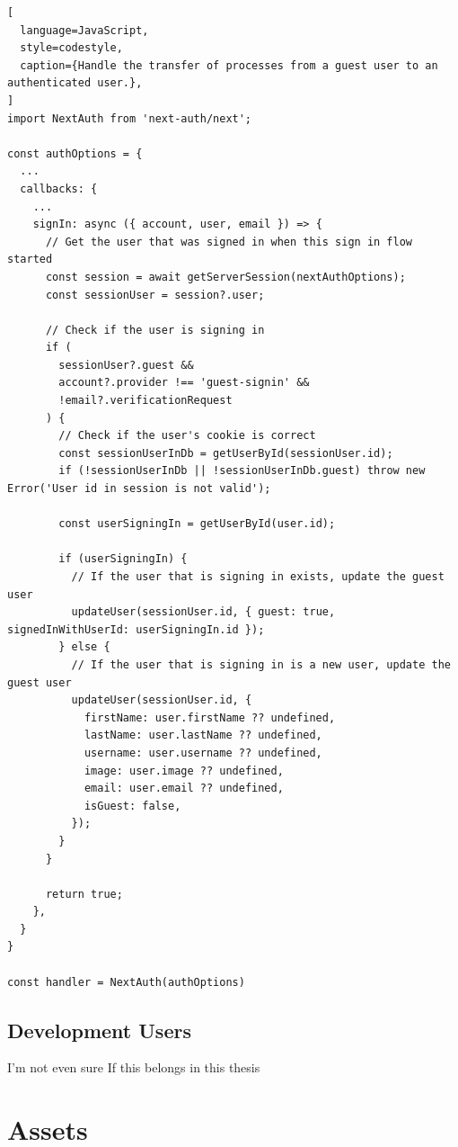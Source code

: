 \begin{lstlisting}[
  language=JavaScript,
  style=codestyle,
  caption={Handle the transfer of processes from a guest user to an authenticated user.},
]
import NextAuth from 'next-auth/next';

const authOptions = {
  ...
  callbacks: {
    ...
    signIn: async ({ account, user, email }) => {
      // Get the user that was signed in when this sign in flow started
      const session = await getServerSession(nextAuthOptions);
      const sessionUser = session?.user;

      // Check if the user is signing in
      if (
        sessionUser?.guest &&
        account?.provider !== 'guest-signin' &&
        !email?.verificationRequest
      ) {
        // Check if the user's cookie is correct
        const sessionUserInDb = getUserById(sessionUser.id);
        if (!sessionUserInDb || !sessionUserInDb.guest) throw new Error('User id in session is not valid');

        const userSigningIn = getUserById(user.id);

        if (userSigningIn) {
          // If the user that is signing in exists, update the guest user
          updateUser(sessionUser.id, { guest: true, signedInWithUserId: userSigningIn.id });
        } else {
          // If the user that is signing in is a new user, update the guest user
          updateUser(sessionUser.id, {
            firstName: user.firstName ?? undefined,
            lastName: user.lastName ?? undefined,
            username: user.username ?? undefined,
            image: user.image ?? undefined,
            email: user.email ?? undefined,
            isGuest: false,
          });
        }
      }

      return true;
    },
  }
}

const handler = NextAuth(authOptions)
\end{lstlisting}


\subsection{Development Users}
\label{cha:ms-architecture:users:development-users}

I'm not even sure If this belongs in this thesis

\section{Assets}

